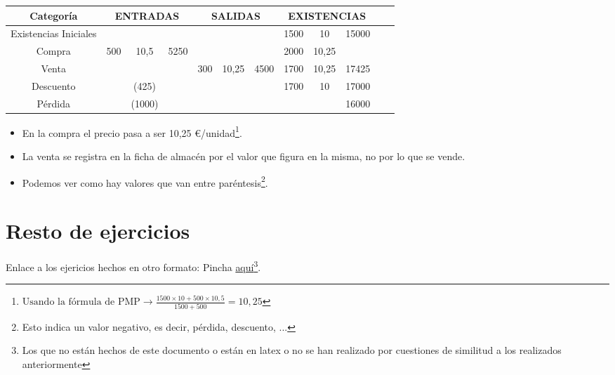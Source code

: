 \documentclass[a4paper,12pt]{article}
\newcommand{\ecuacion}[1]{$#1$}
\begin{document}
\begin{table}[H]
    \centering
    \begin{tabular}{|c|c|c|c|c|c|c|c|c|c|c|c}
        \hline
        \textbf{Categoría}  & \multicolumn{3}{c|}{\textbf{ENTRADAS}} & \multicolumn{3}{c|}{\textbf{SALIDAS}} & \multicolumn{3}{c|}{\textbf{EXISTENCIAS}} \\  \hline
        Existencias Iniciales & & & & & & & 1500 & 10 & 15000\\
        \hline
        Compra & 500 & 10,5 & 5250 & & & & 2000 & 10,25 & \\
        \hline
        Venta & & & & 300 & 10,25 & 4500&1700 &10,25 & 17425\\
        \hline
        Descuento & & (425)& & & & & 1700& 10& 17000\\
        \hline
        Pérdida& & (1000)& & & & & & & 16000\\
        \hline
        
    \end{tabular}    
\end{table}



\begin{itemize}
    \item En la compra el precio pasa a ser 10,25 \euro/unidad\footnote{\ecuacion{\text{Usando la fórmula de PMP} \rightarrow \frac{1500\times10+500\times10,5}{1500+500}=10,25}}.
    \item La venta se registra en la ficha de almacén por el valor que figura en la misma, no por lo que se vende.
    \item Podemos ver como hay valores que van entre paréntesis\footnote{Esto indica un valor negativo, es decir, pérdida, descuento, ...}.
\end{itemize}


\section{Resto de ejercicios}

Enlace a los ejericios hechos en otro formato: Pincha \href{https://github.com/ElblogdeIsmael/ElblogdeIsmael.github.io/blob/main/Asignaturas/Tercer%20A%C3%B1o/CF1/Practica/Tema2/EjerciciosPropuestos/FCCEE/Ejercicios_Profesor.pdf}{aquí}\footnote{Los que no están hechos de este documento o están en latex o no se han realizado por cuestiones de similitud a los realizados anteriormente}.
\end{document}
